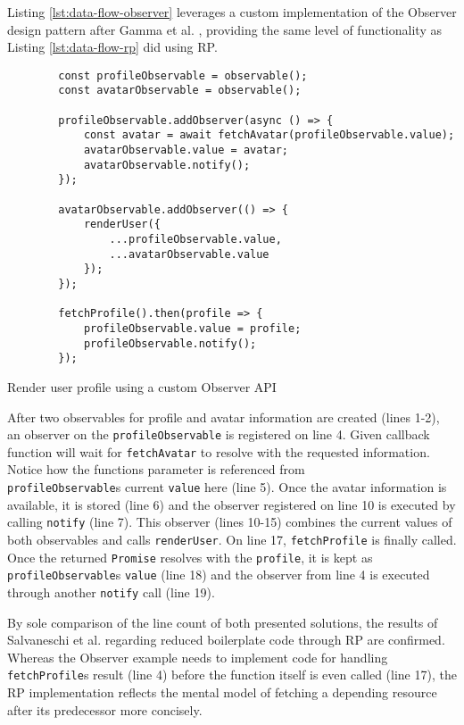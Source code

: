 \documentclass[12pt,a4paper]{article}
\begin{document}
Listing \ref{lst:data-flow-observer} leverages a custom implementation of the Observer design pattern after Gamma et al. \cite{gamma1995design}, providing the same level of functionality as Listing \ref{lst:data-flow-rp} did using RP.

\begin{listing}[ht]
	\begin{verbatim}
		const profileObservable = observable();
		const avatarObservable = observable();

		profileObservable.addObserver(async () => {
			const avatar = await fetchAvatar(profileObservable.value);
			avatarObservable.value = avatar;
			avatarObservable.notify();
		});

		avatarObservable.addObserver(() => {
			renderUser({
				...profileObservable.value,
				...avatarObservable.value
			});
		});

		fetchProfile().then(profile => {
			profileObservable.value = profile;
			profileObservable.notify();
		});
	\end{verbatim}
	\caption{Render user profile using a custom Observer API}
	\label{lst:data-flow-observer}
\end{listing}

After two observables for profile and avatar information are created (lines 1-2), an observer on the \texttt{profileObservable} is registered on line 4. Given callback function will wait for \texttt{fetchAvatar} to resolve with the requested information. Notice how the functions parameter is referenced from\\\texttt{profileObservable}s current \texttt{value} here (line 5). Once the avatar information is available, it is stored (line 6) and the observer registered on line 10 is executed by calling \texttt{notify} (line 7). This observer (lines 10-15) combines the current values of both observables and calls \texttt{renderUser}. On line 17, \texttt{fetchProfile} is finally called. Once the returned \texttt{Promise} resolves with the \texttt{profile}, it is kept as \texttt{profileObservable}s \texttt{value} (line 18) and the observer from line 4 is executed through another \texttt{notify} call (line 19).

By sole comparison of the line count of both presented solutions, the results of Salvaneschi et al. \cite{7827078} regarding reduced boilerplate code through RP are confirmed. Whereas the Observer example needs to implement code for handling \texttt{fetchProfile}s result (line 4) before the function itself is even called (line 17), the RP implementation reflects the mental model of fetching a depending resource after its predecessor more concisely.
\end{document}
